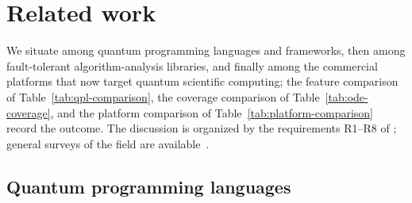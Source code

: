 \section{Related work}
\label{sec:related}

We situate \pqlang{} among quantum programming languages and frameworks,
then among fault-tolerant algorithm-analysis libraries, and finally among
the commercial platforms that now target quantum scientific computing; the
feature comparison of Table~\ref{tab:qpl-comparison}, the coverage
comparison of Table~\ref{tab:ode-coverage}, and the platform comparison
of Table~\ref{tab:platform-comparison} record the outcome.  The
discussion is organized by the
requirements R1--R8 of ; general surveys of the
field are available~\cite{selinger2004towards,heim2020quantum,garhwal2021systematic}.

\subsection{Quantum programming languages}
\label{sec:related-qpl}

